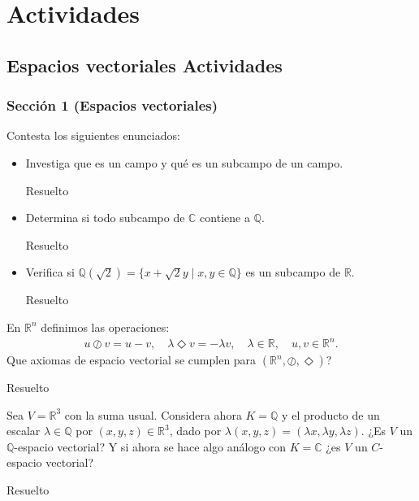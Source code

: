 \chapter{Actividades}
\section{Espacios vectoriales Actividades}

\subsection{Sección 1 (Espacios vectoriales)}
\begin{exercise}{}{}
    Contesta los siguientes enunciados:
\begin{itemize}
    \item Investiga que es un campo y qué es un subcampo de un campo.
\begin{solution}{}{}
    Resuelto
\end{solution}
    \item Determina si todo subcampo de $\mathbb{C}$ contiene a $\mathbb{Q}$.
\begin{solution}{}{}
    Resuelto
\end{solution}
    \item Verifica si $\mathbb{Q}(\sqrt{2})= \{x + \sqrt{2}y \mid x,y \in \mathbb{Q}\}$ es un subcampo de $\mathbb{R}$.
\begin{solution}{}{}
    Resuelto
\end{solution}
\end{itemize}
\end{exercise}


\begin{exercise}{}{}
En $\mathbb{R}^n$ definimos las operaciones:
\begin{align*}
    u \oslash v = u -v, \quad \lambda \Diamond  v = - \lambda v, \quad \lambda \in \mathbb{R}, \quad u,v \in \mathbb{R}^n.
\end{align*}
Que axiomas de espacio vectorial se cumplen para $(\mathbb{R}^n, \oslash, \Diamond)$?
\begin{solution}{}{}
Resuelto
\end{solution}
\end{exercise}

\begin{exercise}{}{}
    Sea $V= \mathbb{R}^3$ con la suma usual. Considera ahora $K= \mathbb{Q}$ y el producto de un escalar $\lambda \in \mathbb{Q}$ por $(x,y,z) \in \mathbb{R}^3$, dado por $\lambda (x,y,z) = (\lambda x, \lambda y, \lambda z)$. ¿Es $V$ un $\mathbb{Q}$-espacio vectorial? Y si ahora se hace algo análogo con $K=\mathbb{C}$ ¿es $V$ un $C$-espacio vectorial?
\begin{solution}{}{}
Resuelto
\end{solution}
\end{exercise}

